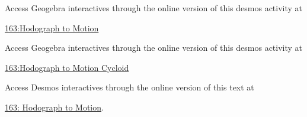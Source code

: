 \documentclass{ximera}
\begin{document}
\begin{exploration}   \label{E67ugfdgtrt}
\begin{onlineOnly}
    \begin{center}
\end{center}
\end{onlineOnly}


Access Geogebra interactives through the online version of this desmos activity at

\href{https://www.geogebra.org/classic/pdefd7mb}{163:Hodograph to Motion}

\end{exploration}
 

\begin{exploration}

\begin{onlineOnly}
    \begin{center}
\end{center}
\end{onlineOnly}



Access Geogebra interactives through the online version of this desmos activity at

\href{https://www.geogebra.org/classic/z4r5quj4}{163:Hodograph to Motion Cycloid}
 
\begin{onlineOnly}
    \begin{center}
\end{center}
\end{onlineOnly}




\end{exploration}








\begin{exploration}
\begin{onlineOnly}
    \begin{center}
\end{center}
\end{onlineOnly}


Access Desmos interactives through the online version of this text at

 
\href{https://www.desmos.com/calculator/ljnsc6jsvt}{163: Hodograph to Motion}.

\end{exploration}
\end{document}
